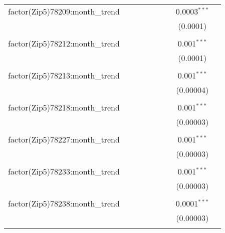\begin{table}[H]
{\begin{tabular}{@{\extracolsep{5pt}}lcccccccc}
  factor(Zip5)78209:month\_trend &  &  &  &  &  &  & 0.0003$^{***}$ &  \\  

   &  &  &  &  &  &  & (0.0001) &  \\  

   & & & & & & & & \\  

  factor(Zip5)78212:month\_trend &  &  &  &  &  &  & 0.001$^{***}$ &  \\  

   &  &  &  &  &  &  & (0.0001) &  \\  

   & & & & & & & & \\  

  factor(Zip5)78213:month\_trend &  &  &  &  &  &  & 0.001$^{***}$ &  \\  

   &  &  &  &  &  &  & (0.00004) &  \\  

   & & & & & & & & \\  

  factor(Zip5)78218:month\_trend &  &  &  &  &  &  & 0.001$^{***}$ &  \\  

   &  &  &  &  &  &  & (0.00003) &  \\  

   & & & & & & & & \\  

  factor(Zip5)78227:month\_trend &  &  &  &  &  &  & 0.001$^{***}$ &  \\  

   &  &  &  &  &  &  & (0.00003) &  \\  

   & & & & & & & & \\  

  factor(Zip5)78233:month\_trend &  &  &  &  &  &  & 0.001$^{***}$ &  \\  

   &  &  &  &  &  &  & (0.00003) &  \\  

   & & & & & & & & \\  

  factor(Zip5)78238:month\_trend &  &  &  &  &  &  & 0.0001$^{***}$ &  \\  

   &  &  &  &  &  &  & (0.00003) &  \\  

   & & & & & & & & \\  


\end{tabular}}
\end{table}
